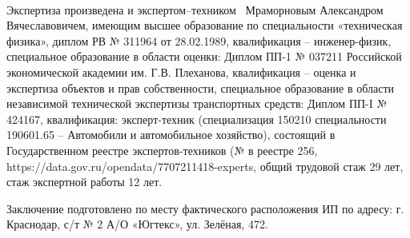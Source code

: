 \paragraph*{}
Экспертиза произведена   
и экспертом--техником %
\,  Мраморновым Александром Вячеславовичем, имеющим высшее  образование по специальности «техническая физика», диплом РВ № 311964 от 28.02.1989, квалификация -- инженер-физик, специальное образование в области оценки: Диплом ПП-1 № 037211 Российской экономической академии им. Г.В. Плеханова, квалификация -- оценка и экспертиза объектов и прав собственности, специальное образование в области независимой технической экспертизы транспортных средств: Диплом ПП-I № 424167, квалификация: эксперт-техник (специализация 150210 специальности 190601.65 – Автомобили и автомобильное хозяйство), состоящий в Государственном реестре экспертов-техников (№ в реестре 256, https://data.gov.ru/opendata/7707211418-experts,  общий трудовой  стаж 29 лет, стаж  экспертной работы  12 лет. \par Заключение подготовлено по месту фактического расположения ИП по адресу: г. Краснодар, с/т № 2 А/О «Югтекс», ул. Зелёная, 472.
